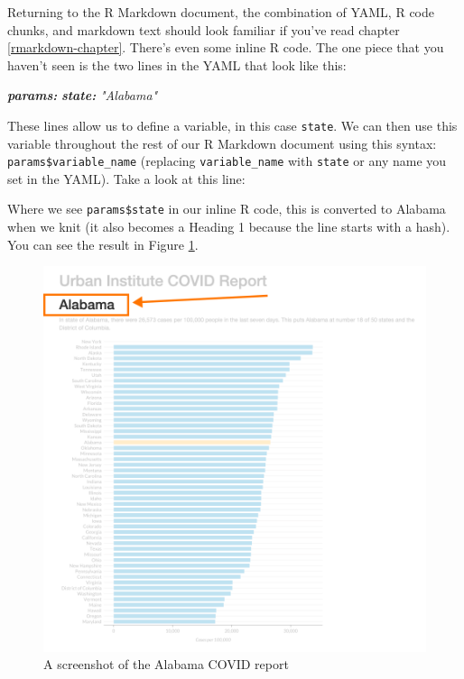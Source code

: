 \documentclass[
]{book}
\newenvironment{Shaded}{\begin{snugshade}}{\end{snugshade}}
\newcommand{\AnnotationTok}[1]{\textcolor[rgb]{0.56,0.35,0.01}{\textbf{\textit{#1}}}}
\newcommand{\CommentTok}[1]{\textcolor[rgb]{0.56,0.35,0.01}{\textit{#1}}}
\newcommand{\FunctionTok}[1]{\textcolor[rgb]{0.00,0.00,0.00}{#1}}
\begin{document}
Returning to the R Markdown document, the combination of YAML, R code chunks, and markdown text should look familiar if you've read chapter \ref{rmarkdown-chapter}. There's even some inline R code. The one piece that you haven't seen is the two lines in the YAML that look like this:

\begin{Shaded}
\begin{Highlighting}[]
\AnnotationTok{params:}
\AnnotationTok{state:}\CommentTok{ "Alabama"}
\end{Highlighting}
\end{Shaded}

These lines allow us to define a variable, in this case \texttt{state}. We can then use this variable throughout the rest of our R Markdown document using this syntax: \texttt{params\$variable\_name} (replacing \texttt{variable\_name} with \texttt{state} or any name you set in the YAML). Take a look at this line:

\begin{Shaded}
\end{Shaded}

Where we see \texttt{params\$state} in our inline R code, this is converted to Alabama when we knit (it also becomes a Heading 1 because the line starts with a hash). You can see the result in Figure \ref{fig:alabama-covid-report-header}.

\begin{figure}
\includegraphics[width=1\linewidth]{assets/alabama-covid-report-header} \caption{A screenshot of the Alabama COVID report}\label{fig:alabama-covid-report-header}
\end{figure}
\end{document}
